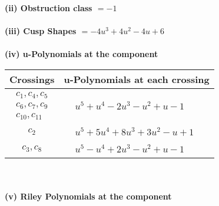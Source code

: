 \documentclass[1p]{elsarticle_modified}
\theoremstyle{definition}
\begin{document}
\flushleft \textbf{(ii) Obstruction class $= -1$}\\~\\
\flushleft \textbf{(iii) Cusp Shapes $= -4 u^3+4 u^2-4 u+6$}\\~\\
\newpage\renewcommand{\arraystretch}{1}
\flushleft \textbf{(iv) u-Polynomials at the component}\newline \\
\begin{tabular}{m{50pt}|m{274pt}}
Crossings & \hspace{64pt}u-Polynomials at each crossing \\
\hline $$\begin{aligned}c_{1},c_{4},c_{5}\\c_{6},c_{7},c_{9}\\c_{10},c_{11}\end{aligned}$$&$\begin{aligned}
&u^5+u^4-2 u^3- u^2+u-1
\end{aligned}$\\
\hline $$\begin{aligned}c_{2}\end{aligned}$$&$\begin{aligned}
&u^5+5 u^4+8 u^3+3 u^2- u+1
\end{aligned}$\\
\hline $$\begin{aligned}c_{3},c_{8}\end{aligned}$$&$\begin{aligned}
&u^5- u^4+2 u^3- u^2+u-1
\end{aligned}$\\
\hline
\end{tabular}\\~\\
\newpage\renewcommand{\arraystretch}{1}
\flushleft \textbf{(v) Riley Polynomials at the component}\newline \\
\end{document}
